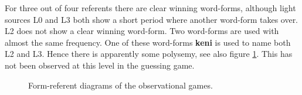For three out of four referents there are clear winning word-forms, although light sources L0 and L3 both show a short period where another word-form takes over. L2 does not show a clear winning word-form. Two word-forms are used with almost the same frequency. One of these word-forms {\bf keni} is used to name both L2 and L3. Hence there is apparently some polysemy, see also figure \ref{f:opt:froli}. This has not been observed at this level in the guessing game.

\begin{figure}[t]
\centering
{}
\caption{Form-referent diagrams of the observational games.}
\label{f:opt:froli}
\end{figure}


